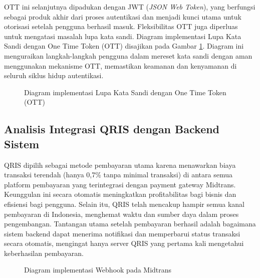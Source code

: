 OTT ini selanjutnya dipadukan dengan JWT (\textit{JSON Web Token}), yang berfungsi sebagai produk akhir dari proses autentikasi dan menjadi kunci utama untuk otorisasi setelah pengguna berhasil masuk. Fleksibilitas OTT juga diperluas untuk mengatasi masalah lupa kata sandi. Diagram implementasi Lupa Kata Sandi dengan One Time Token (OTT) disajikan pada Gambar \ref{fig:diagram_fp_ott}. Diagram ini menguraikan langkah-langkah pengguna dalam mereset kata sandi dengan aman menggunakan mekanisme OTT, memastikan keamanan dan kenyamanan di seluruh siklus hidup autentikasi.

\begin{figure}[H]
    \centering
    \caption{Diagram implementasi Lupa Kata Sandi dengan One Time Token (OTT)}
    \label{fig:diagram_fp_ott}
\end{figure}

\subsection{Analisis Integrasi QRIS dengan Backend Sistem}

QRIS dipilih sebagai metode pembayaran utama karena menawarkan biaya transaksi terendah (hanya 0,7\% tanpa minimal transaksi) di antara semua platform pembayaran yang terintegrasi dengan payment gateway Midtrans. Keunggulan ini secara otomatis meningkatkan profitabilitas bagi bisnis dan efisiensi bagi pengguna. Selain itu, QRIS telah mencakup hampir semua kanal pembayaran di Indonesia, menghemat waktu dan sumber daya dalam proses pengembangan. Tantangan utama setelah pembayaran berhasil adalah bagaimana sistem backend dapat menerima notifikasi dan memperbarui status transaksi secara otomatis, mengingat hanya server QRIS yang pertama kali mengetahui keberhasilan pembayaran.

\begin{figure}[H]
    \centering
    \caption{Diagram implementasi Webhook pada Midtrans}
    \label{fig:midtrans_bab4}
\end{figure}

